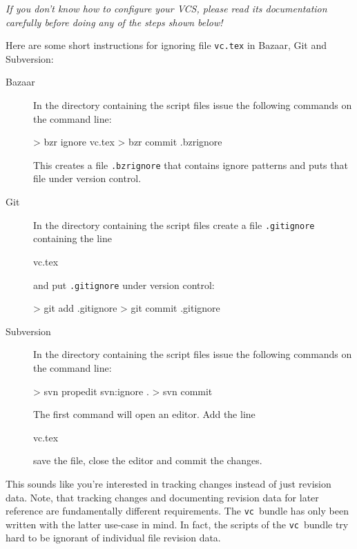 \documentclass[11pt]{article}
\newcommand*{\pkg}{\texttt{vc}}
\begin{document}
 \emph{If you don't know how to configure your
  VCS, please read its documentation carefully before doing any of the
  steps shown below!}

Here are some short instructions for ignoring file \texttt{vc.tex} in
Bazaar, Git and Subversion:
\begin{description}
\item[Bazaar] In the directory containing the script files issue the
  following commands on the command line:
\begin{listing}[style=shell]
> bzr ignore vc.tex
> bzr commit .bzrignore
\end{listing}
This creates a file \texttt{.bzrignore} that contains ignore patterns
and puts that file under version control.

\item[Git] In the directory containing the script files create a file
  \texttt{.gitignore} containing the line
\begin{listing}[style=text]
vc.tex
\end{listing}
and put \texttt{.gitignore} under version control:
\begin{listing}[style=shell]
> git add .gitignore
> git commit .gitignore
\end{listing}

\item[Subversion] In the directory containing the script files issue the
  following commands on the command line:
\begin{listing}[style=shell]
> svn propedit svn:ignore .
> svn commit
\end{listing}
The first command will open an editor.  Add the line
\begin{listing}[style=text]
vc.tex
\end{listing}
save the file, close the editor and commit the changes.
\end{description}

 This sounds like you're interested in tracking
changes instead of just revision data.  Note, that tracking changes and
documenting revision data for later reference are fundamentally
different requirements.  The \pkg\ bundle has only been written with the
latter use-case in mind.  In fact, the scripts of the \pkg\ bundle try
hard to be ignorant of individual file revision data.
\end{document}
